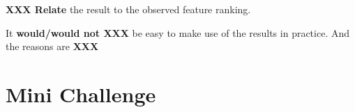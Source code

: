 \documentclass[12pt,journal,compsoc]{IEEEtran}
\begin{document}
\textbf{XXX Relate} the result to the observed feature ranking.

It \textbf{would/would not XXX} be easy to make use of the results in practice. And the reasons are \textbf{XXX}

\section{Mini Challenge}


\end{document}
